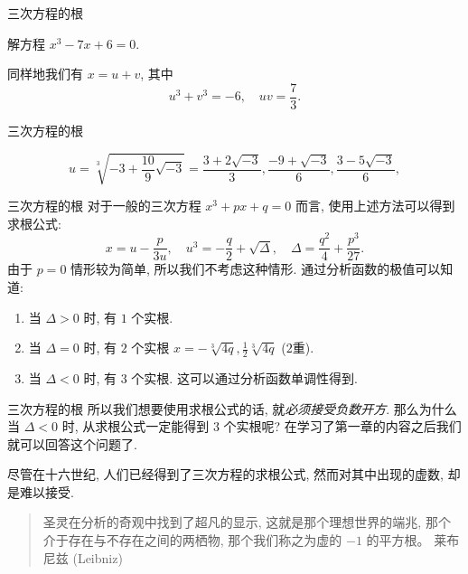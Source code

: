 \begin{frame}{三次方程的根}
\onslide<+->
\begin{example}
解方程 $x^3-7x+6=0$.
\end{example}
\onslide<+->
\begin{solution}
\indent 同样地我们有 $x=u+v$, 其中
	\[u^3+v^3=-6,\quad uv=\frac73.\]

\vspace{-1.3\baselineskip}
\end{solution}
\end{frame}


\begin{frame}{三次方程的根}
\onslide<+->
\begin{solutionc}
	\[u=\sqrt[3]{-3+\frac{10}9\sqrt{-3}}
	=\frac{3+2\sqrt{-3}}3,\frac{-9+\sqrt{-3}}6,\frac{3-5\sqrt{-3}}6,\]
\visible<+->{相应地
	\[v=\frac{3-2\sqrt{-3}}3,\frac{-9-\sqrt{-3}}6,\frac{3+5\sqrt{-3}}6,\]}
\visible<+->{\[x=u+v=2,-3,1.\]}
\vspace{-\baselineskip}
\end{solutionc}
\end{frame}


\begin{frame}{三次方程的根}
\onslide<+->对于一般的三次方程 $x^3+px+q=0$ 而言, 使用上述方法可以得到求根公式:
\[x=u-\frac p{3u},\quad u^3=-\frac q2+\sqrt{\Delta},\quad \Delta=\frac{q^2}4+\frac{p^3}{27}.\]
\onslide<+->由于 $p=0$ 情形较为简单, 所以我们不考虑这种情形.
\onslide<+->通过分析函数的极值可以知道:
\begin{enumerate}
\item 当 $\Delta>0$ 时, 有 $1$ 个实根.
\item 当 $\Delta=0$ 时, 有 $2$ 个实根 $x=-\sqrt[3]{4q},\frac12\sqrt[3]{4q}$ ($2$重).
\item 当 $\Delta<0$ 时, 有 $3$ 个实根. 这可以通过分析函数单调性得到.
\end{enumerate}
\end{frame}


\begin{frame}{三次方程的根}
\onslide<+->所以我们想要使用求根公式的话, 就\emph{必须接受负数开方}.
\onslide<+->那么为什么当 $\Delta<0$ 时, 从求根公式一定能得到 $3$ 个实根呢?
\onslide<+->在学习了第一章的内容之后我们就可以回答这个问题了.

\onslide<+->尽管在十六世纪, 人们已经得到了三次方程的求根公式, 然而对其中出现的虚数, 却是难以接受.
\onslide<+->
\begin{quote}
\indent 圣灵在分析的奇观中找到了超凡的显示, 这就是那个理想世界的端兆, 那个介于存在与不存在之间的两栖物, 那个我们称之为虚的 $-1$ 的平方根。
\tcblower
莱布尼兹 (Leibniz)
\end{quote}
\end{frame}

